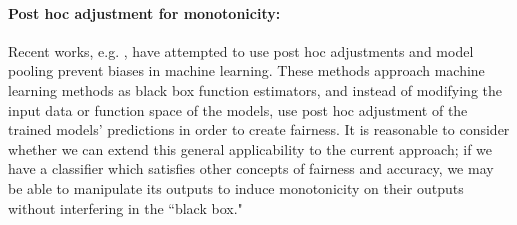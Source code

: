     \paragraph{Post hoc adjustment for monotonicity:} 
        Recent works, e.g. \cite{lohia2019bias}, have attempted to use post hoc adjustments and model pooling prevent biases in machine learning.  These methods approach machine learning methods as black box function estimators, and instead of modifying the input data or function space of the models, use post hoc adjustment of the trained models' predictions in order to create fairness.  It is reasonable to consider whether we can extend this general applicability to the current approach; if we have a classifier which satisfies other concepts of fairness and accuracy, we may be able to manipulate its outputs to induce monotonicity on their outputs without interfering in the ``black box."
        